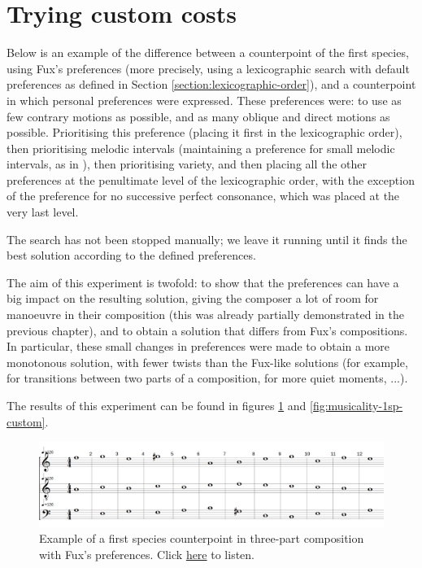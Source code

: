 \section{Trying custom costs}
Below is an example of the difference between a counterpoint of the first species, using Fux's preferences (more precisely, using a lexicographic search with default preferences as defined in Section \ref{section:lexicographic-order}), and a counterpoint in which personal preferences were expressed. These preferences were: to use as few contrary motions as possible, and as many oblique and direct motions as possible. Prioritising this preference (placing it first in the lexicographic order), then prioritising melodic intervals (maintaining a preference for small melodic intervals, as in \gap), then prioritising variety, and then placing all the other preferences at the penultimate level of the lexicographic order, with the exception of the preference for no successive perfect consonance, which was placed at the very last level.

The search has not been stopped manually; we leave it running until it finds the best solution according to the defined preferences.

The aim of this experiment is twofold: to show that the preferences can have a big impact on the resulting solution, giving the composer a lot of room for manoeuvre in their composition (this was already partially demonstrated in the previous chapter), and to obtain a solution that differs from Fux's compositions. In particular, these small changes in preferences were made to obtain a more monotonous solution, with fewer twists than the Fux-like solutions (for example, for transitions between two parts of a composition, for more quiet moments, ...).

The results of this experiment can be found in figures \ref{fig:musicality-1sp-fux} and \ref{fig:musicality-1sp-custom}.
\begin{figure}[h!]
    \centering
    \includegraphics[width=1\textwidth]{Images/Musicality/musicality-1sp-fux-pref.png}
    \caption{Example of a first species counterpoint in three-part composition with Fux's preferences. Click \href{https://youtu.be/rXGOzidniA0}{here} to listen.}
    \label{fig:musicality-1sp-fux}
\end{figure}

